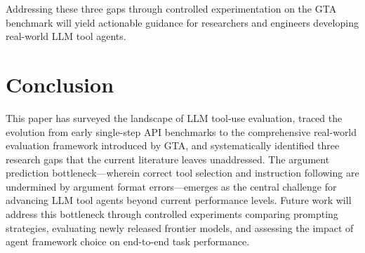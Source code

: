 \documentclass[conference]{IEEEtran}
\begin{document}
Addressing these three gaps through controlled experimentation on the GTA benchmark will yield actionable guidance for researchers and engineers developing real-world LLM tool agents.

\section{Conclusion}

This paper has surveyed the landscape of LLM tool-use evaluation, traced the evolution from early single-step API benchmarks to the comprehensive real-world evaluation framework introduced by GTA, and systematically identified three research gaps that the current literature leaves unaddressed. The argument prediction bottleneck---wherein correct tool selection and instruction following are undermined by argument format errors---emerges as the central challenge for advancing LLM tool agents beyond current performance levels. Future work will address this bottleneck through controlled experiments comparing prompting strategies, evaluating newly released frontier models, and assessing the impact of agent framework choice on end-to-end task performance.
\end{document}
